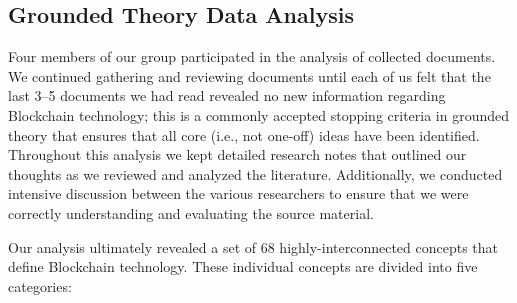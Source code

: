 \subsection{Grounded Theory Data Analysis}
Four members of our group participated in the analysis of collected documents.
We continued gathering and reviewing documents until each of us felt that the last 3--5 documents we had read revealed no new information regarding Blockchain technology; this is a commonly accepted stopping criteria in grounded theory that ensures that all core (i.e., not one-off) ideas have been identified.
Throughout this analysis we kept detailed research notes that outlined our thoughts as we reviewed and analyzed the literature.
Additionally, we conducted intensive discussion between the various researchers to ensure that we were correctly understanding and evaluating the source material.

Our analysis ultimately revealed a set of 68 highly-interconnected concepts that define Blockchain technology.
These individual concepts are divided into five categories:


